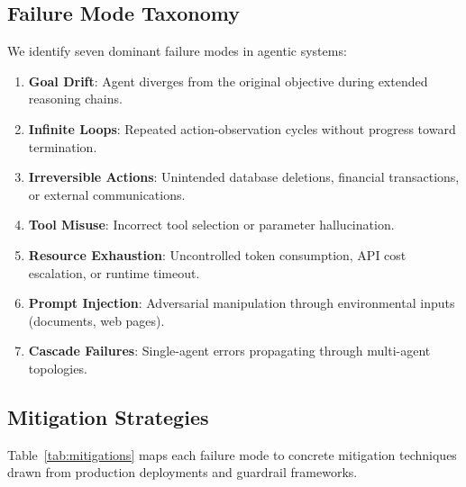 \documentclass[12pt, a4paper]{article}
\begin{document}
\subsection{Failure Mode Taxonomy}
We identify seven dominant failure modes in agentic systems:
\begin{enumerate}
    \item \textbf{Goal Drift}: Agent diverges from the original objective during extended reasoning chains.
    \item \textbf{Infinite Loops}: Repeated action-observation cycles without progress toward termination.
    \item \textbf{Irreversible Actions}: Unintended database deletions, financial transactions, or external communications.
    \item \textbf{Tool Misuse}: Incorrect tool selection or parameter hallucination.
    \item \textbf{Resource Exhaustion}: Uncontrolled token consumption, API cost escalation, or runtime timeout.
    \item \textbf{Prompt Injection}: Adversarial manipulation through environmental inputs (documents, web pages).
    \item \textbf{Cascade Failures}: Single-agent errors propagating through multi-agent topologies.
\end{enumerate}

\subsection{Mitigation Strategies}
Table~\ref{tab:mitigations} maps each failure mode to concrete mitigation techniques drawn from production deployments and guardrail frameworks.
\end{document}
